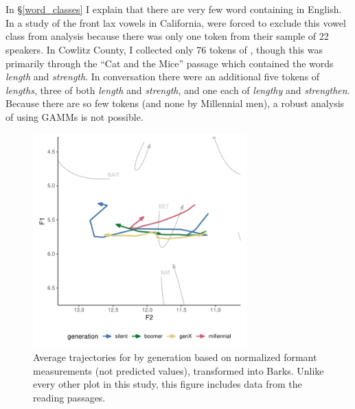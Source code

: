 \section{\beng}
\label{BENG}

In \S\ref{word_classes} I explain that there are very few word containing \beng in English. In a study of the front lax vowels in California, \citet[40]{cardoso_etal_2016_pads} were forced to exclude this vowel class from analysis because there was only one token from their sample of 22 speakers. In Cowlitz County, I collected only 76 tokens of \beng, though this was primarily through the ``Cat and the Mice'' passage which contained the words \textit{length} and \textit{strength}. In conversation there were an additional five tokens of \textit{lengths}, three of both \textit{length} and \textit{strength}, and one each of \textit{lengthy} and \textit{strengthen}. Because there are so few tokens (and none by Millennial men), a robust analysis of \beng using GAMMs is not possible.

\begin{figure}[tb!]
	\centering
	\includegraphics[width = 3.25in]{Figures/BENG/BENG_raw.pdf}
	\caption[Average trajectories for \beng by generation.]{Average trajectories for \beng by generation based on normalized formant measurements (not predicted values), transformed into Barks. Unlike every other plot in this study, this figure includes data from the reading passages.}
	\label{fig:BENG}
\end{figure}

